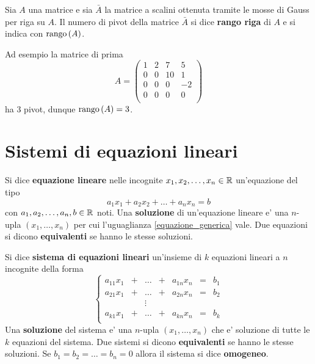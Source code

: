 \begin{definition}
    Sia $A$ una matrice e sia $\bar{A}$ la matrice a scalini ottenuta tramite le mosse di Gauss per riga su $A$. Il numero di pivot della matrice $\bar{A}$ si dice \textbf{rango riga} di $A$ e si indica con $\operatorname{rango}\left( A \right)$.
\end{definition}

Ad esempio la matrice di prima \[
    A = \begin{pmatrix}
        1   &2  &7  &5\\
        0   &0  &10 &1\\
        0   &0  &0  &-2\\
        0   &0  &0  &0\\
    \end{pmatrix}
\]  ha 3 pivot, dunque $\operatorname{rango}\left( A \right) = 3$.

\section{Sistemi di equazioni lineari}

\begin{definition}
    Si dice \textbf{equazione lineare} nelle incognite $x_1, x_2, \dots, x_n \in \mathbb{R}$ un'equazione del tipo
    \begin{equation} \label{equazione_generica}
        a_1x_1 + a_2x_2 + \dots + a_nx_n = b
    \end{equation}
    con $a_1, a_2, \dots, a_n, b \in \mathbb{R}$ noti.
    Una \textbf{soluzione} di un'equazione lineare e' una $n$-upla $(x_1, \dots, x_n)$ per cui l'uguaglianza \ref{equazione_generica} vale.
    Due equazioni si dicono \textbf{equivalenti} se hanno le stesse soluzioni.
\end{definition}

\begin{definition}
    Si dice \textbf{sistema di equazioni lineari} un'insieme di $k$ equazioni lineari a $n$ incognite della forma
    \begin{equation}
        \left\{
        \begin{array}{ rororor }
        a_{11}x_1 & + & \dots & + & a_{1n}x_n & = & b_1 \\
        a_{21}x_1 & + & \dots & + & a_{2n}x_n & = & b_2 \\
        &&\vdots\\
        a_{k1}x_1 & + & \dots & + & a_{kn}x_n & = & b_k \\
        \end{array}
        \right.
    \end{equation}
    Una \textbf{soluzione} del sistema e' una $n$-upla $(x_1, \dots, x_n)$ che e' soluzione di tutte le $k$ equazioni del sistema.
    Due sistemi si dicono \textbf{equivalenti} se hanno le stesse soluzioni.
    Se $b_1 = b_2 = \dots = b_n = 0$ allora il sistema si dice \textbf{omogeneo}.
\end{definition}

